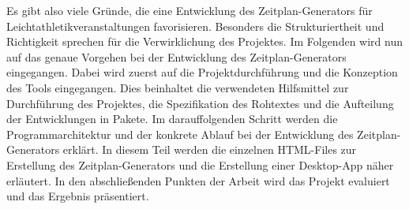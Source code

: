 Es gibt also viele Gründe, die eine Entwicklung des Zeitplan-Generators für Leichtathletikveranstaltungen favorisieren. Besonders die Strukturiertheit und Richtigkeit sprechen für die Verwirklichung des Projektes. Im Folgenden wird nun auf das genaue Vorgehen bei der Entwicklung des Zeitplan-Generators eingegangen. Dabei wird zuerst auf die Projektdurchführung und die Konzeption des Tools eingegangen. Dies beinhaltet die verwendeten Hilfsmittel zur Durchführung des Projektes, die Spezifikation des Rohtextes und die Aufteilung der Entwicklungen in Pakete. Im darauffolgenden Schritt werden die Programmarchitektur und der konkrete Ablauf bei der Entwicklung des Zeitplan-Generators erklärt. In diesem Teil werden die einzelnen HTML-Files zur Erstellung des Zeitplan-Generators und die Erstellung einer Desktop-App näher erläutert. In den abschließenden Punkten der Arbeit wird das Projekt evaluiert und das Ergebnis präsentiert.


